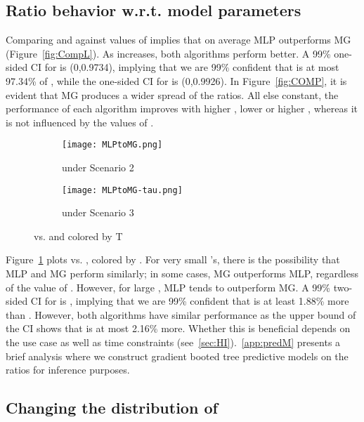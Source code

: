 \documentclass[oribibl]{llncs}
\begin{document}
\subsection {Ratio behavior w.r.t. model parameters}
Comparing  and  against values of  implies that on average MLP outperforms MG (Figure~\ref{fig:CompL}). As  increases, both algorithms perform better. A 99\% one-sided CI for  is (0,0.9734), implying that we are 99\% confident that  is at most 97.34\% of , while the one-sided CI for  is (0,0.9926). In Figure~\ref{fig:COMP}, it is evident that MG produces a wider spread of the ratios. All else constant, the performance of each algorithm improves with higher , lower  or higher , whereas it is not influenced by the values of . 

\begin{figure}[ht]\centering 
\vspace{-13pt}
\begin{subfigure}{.48\textwidth}
  \centering
\texttt{[image: MLPtoMG.png]}
\caption{under Scenario 2}
\label{fig:MLPtoMG}
\end{subfigure}
\hfill
\begin{subfigure}{.48\textwidth}
  \centering
\texttt{[image: MLPtoMG-tau.png]}
\caption{under Scenario 3}
\label{fig:MLPtoMGtau}
\end{subfigure}
\caption{ vs.  and colored by T}
\end{figure}





Figure~\ref{fig:MLPtoMG} plots  vs. , colored by . For very small 's, there is the
possibility that MLP and MG perform similarly; in some cases, MG
outperforms MLP, regardless of the value of . However, for large
, MLP tends to outperform MG. A 99\% two-sided CI for
 is , implying that we are 99\%
confident that  is at least 1.88\% more
than . However, both algorithms have similar performance as the
upper bound of the CI shows that  is at most
2.16\% more. Whether this is beneficial depends on the use case as
well as time constraints (see~\ref{sec:HI}).~\ref{app:predM} presents a brief analysis where we construct
gradient booted tree predictive models on the ratios for inference
purposes. 




\vspace{-14pt}
\subsection{Changing the distribution of }
\end{document}
